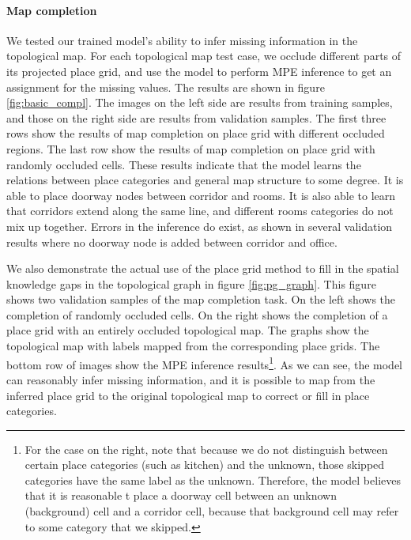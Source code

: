 \documentclass[10pt, titlepage]{article}
\theoremstyle{definition}
\begin{document}
\paragraph{Map completion} We tested our trained model's ability to infer missing information in the topological map. For each topological map test case, we occlude different parts of its projected place grid, and use the model to perform MPE inference to get an assignment for the missing values. The results are shown in figure \ref{fig:basic_compl}. The images on the left side are results from training samples, and those on the right side are results from validation samples. The first three rows show the results of map completion on place grid with different occluded regions. The last row show the results of map completion on place grid with randomly occluded cells. These results  indicate that the model learns the relations between place categories and general map structure to some degree. It is able to place doorway nodes between corridor and rooms. It is also able to learn that corridors extend along the same line, and different rooms categories do not mix up together. Errors in the inference do exist, as shown in several validation results where no doorway node is added between corridor and office.

We also demonstrate the actual use of the place grid method to fill in the spatial knowledge gaps in the topological graph in figure \ref{fig:pg_graph}. This figure shows two validation samples of the map completion task. On the left shows the completion of randomly occluded cells. On the right shows the completion of a place grid with an entirely occluded topological map. The graphs show the topological map with labels mapped from the corresponding place grids. The bottom row of images show the MPE inference results\footnote{For the case on the right, note that because we do not distinguish between certain place categories (such as kitchen) and the unknown, those skipped categories have the same label as the unknown. Therefore, the model believes that it is reasonable t  place a doorway cell between an unknown (background) cell and a corridor cell, because that background cell may refer to some category that we skipped.}. As we can see, the model can reasonably infer missing information, and it is possible to map from the inferred place grid to the original topological map to correct or fill in place categories.
\end{document}
